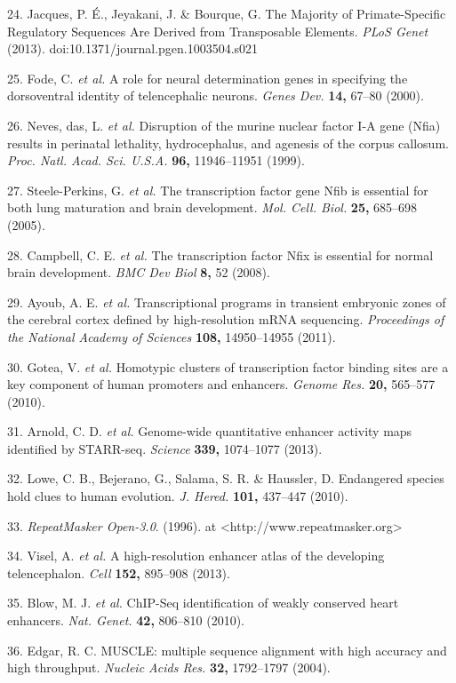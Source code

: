 \documentclass[]{article}
\begin{document}
24. Jacques, P. É., Jeyakani, J. \& Bourque, G. The Majority of
Primate-Specific Regulatory Sequences Are Derived from Transposable
Elements. \emph{PLoS Genet} (2013).
doi:10.1371/journal.pgen.1003504.s021

25. Fode, C. \emph{et al.} A role for neural determination genes in
specifying the dorsoventral identity of telencephalic neurons.
\emph{Genes Dev.} \textbf{14,} 67--80 (2000).

26. Neves, das, L. \emph{et al.} Disruption of the murine nuclear factor
I-A gene (Nfia) results in perinatal lethality, hydrocephalus, and
agenesis of the corpus callosum. \emph{Proc. Natl. Acad. Sci. U.S.A.}
\textbf{96,} 11946--11951 (1999).

27. Steele-Perkins, G. \emph{et al.} The transcription factor gene Nfib
is essential for both lung maturation and brain development. \emph{Mol.
Cell. Biol.} \textbf{25,} 685--698 (2005).

28. Campbell, C. E. \emph{et al.} The transcription factor Nfix is
essential for normal brain development. \emph{BMC Dev Biol} \textbf{8,}
52 (2008).

29. Ayoub, A. E. \emph{et al.} Transcriptional programs in transient
embryonic zones of the cerebral cortex defined by high-resolution mRNA
sequencing. \emph{Proceedings of the National Academy of Sciences}
\textbf{108,} 14950--14955 (2011).

30. Gotea, V. \emph{et al.} Homotypic clusters of transcription factor
binding sites are a key component of human promoters and enhancers.
\emph{Genome Res.} \textbf{20,} 565--577 (2010).

31. Arnold, C. D. \emph{et al.} Genome-wide quantitative enhancer
activity maps identified by STARR-seq. \emph{Science} \textbf{339,}
1074--1077 (2013).

32. Lowe, C. B., Bejerano, G., Salama, S. R. \& Haussler, D. Endangered
species hold clues to human evolution. \emph{J. Hered.} \textbf{101,}
437--447 (2010).

33. \emph{RepeatMasker Open-3.0}. (1996). at
\textless{}http://www.repeatmasker.org\textgreater{}

34. Visel, A. \emph{et al.} A high-resolution enhancer atlas of the
developing telencephalon. \emph{Cell} \textbf{152,} 895--908 (2013).

35. Blow, M. J. \emph{et al.} ChIP-Seq identification of weakly
conserved heart enhancers. \emph{Nat. Genet.} \textbf{42,} 806--810
(2010).

36. Edgar, R. C. MUSCLE: multiple sequence alignment with high accuracy
and high throughput. \emph{Nucleic Acids Res.} \textbf{32,} 1792--1797
(2004).
\end{document}
